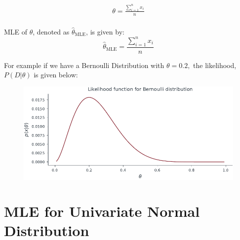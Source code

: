 \documentclass[handout]{beamer}
\begin{document}
\begin{frame}
        
    \begin{align*}
        \theta=\frac{\sum_{i=1}^n x_{i}}{n}\\
    \end{align*}
    \begin{tcolorbox}[colback=metropolisblue!5,colframe=metropolisblue,title=Maximum Likelihood Estimate for $\theta$]
        MLE of $\theta$, denoted as $\hat{\theta}_{\text{MLE}}$, is given by:
        \begin{equation*}
            \hat{\theta}_{\text{MLE}} = \frac{\sum_{i=1}^n x_{i}}{n}
        \end{equation*}
    \end{tcolorbox}
    
    \end{frame}

\begin{frame}
For example if we have a Bernoulli Distribution with $\theta=0.2,$ the likelihood, $P(D|\theta)$ is given below:
\begin{figure}
                \centerline{\includegraphics[scale = 0.75]{../figures/mle/bernoulli_likelihood.pdf}}
\end{figure}
    
\end{frame}



\section{MLE for Univariate Normal Distribution}
\end{document}
